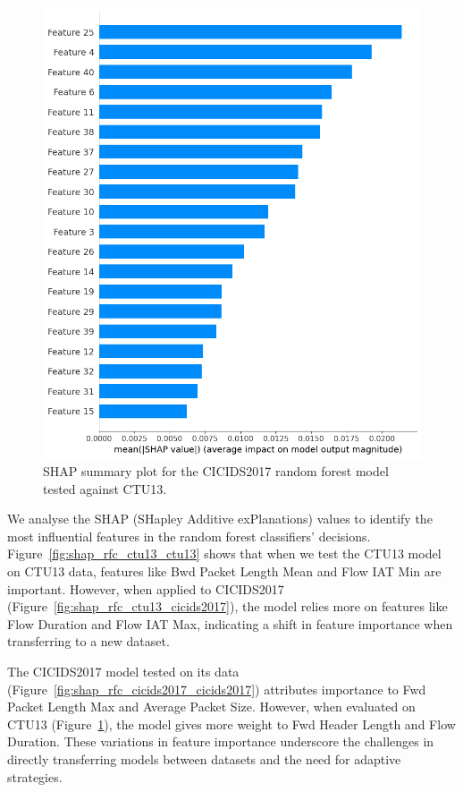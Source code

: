\begin{figure}[H]
    \centering
    \includegraphics[width=1\textwidth]{img/SHAP_RFCICIDS2017_CTU13.png}
    \caption{SHAP summary plot for the CICIDS2017 random forest model tested against CTU13.}\label{fig:shap_rfc_cicids2017_ctu13}
\end{figure}

We analyse the SHAP (SHapley Additive exPlanations) values to identify the most influential features in the random forest classifiers' decisions. Figure~\ref{fig:shap_rfc_ctu13_ctu13} shows that when we test the CTU13 model on CTU13 data, features like Bwd Packet Length Mean and Flow IAT Min are important. However, when applied to CICIDS2017 (Figure~\ref{fig:shap_rfc_ctu13_cicids2017}), the model relies more on features like Flow Duration and Flow IAT Max, indicating a shift in feature importance when transferring to a new dataset.

The CICIDS2017 model tested on its data (Figure~\ref{fig:shap_rfc_cicids2017_cicids2017}) attributes importance to Fwd Packet Length Max and Average Packet Size. However, when evaluated on CTU13 (Figure~\ref{fig:shap_rfc_cicids2017_ctu13}), the model gives more weight to Fwd Header Length and Flow Duration. These variations in feature importance underscore the challenges in directly transferring models between datasets and the need for adaptive strategies.